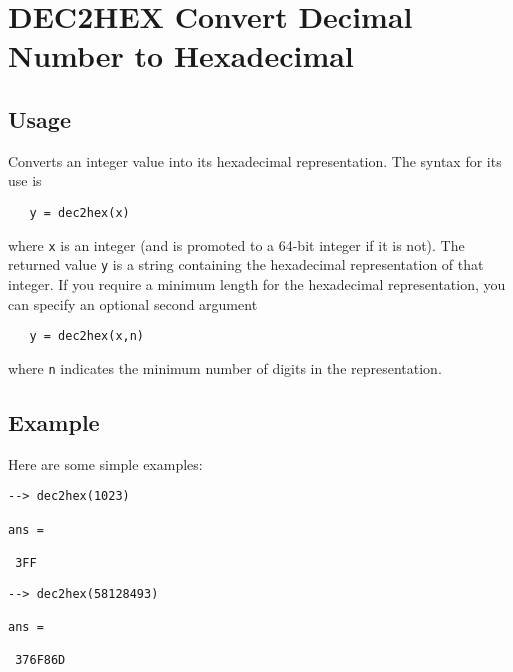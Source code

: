 \section{DEC2HEX Convert Decimal Number to Hexadecimal}

\subsection{Usage}

Converts an integer value into its hexadecimal representation.  The syntax
for its use is
\begin{verbatim}
   y = dec2hex(x)
\end{verbatim}
where \verb|x| is an integer (and is promoted to a 64-bit integer if it is not).
The returned value \verb|y| is a string containing the hexadecimal representation
of that integer.  If you require a minimum length for the hexadecimal
representation, you can specify an optional second argument
\begin{verbatim}
   y = dec2hex(x,n)
\end{verbatim}
where \verb|n| indicates the minimum number of digits in the representation.
\subsection{Example}

Here are some simple examples:
\begin{verbatim}
--> dec2hex(1023)

ans = 

 3FF
\end{verbatim}
\begin{verbatim}
--> dec2hex(58128493)

ans = 

 376F86D
\end{verbatim}
